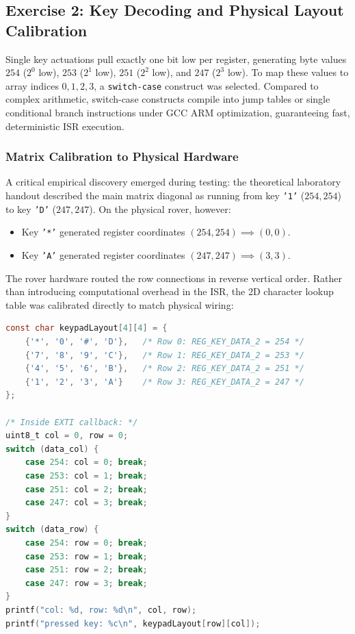 \subsection{Exercise 2: Key Decoding and Physical Layout Calibration}
Single key actuations pull exactly one bit low per register, generating byte values $254$ ($2^0$ low), $253$ ($2^1$ low), $251$ ($2^2$ low), and $247$ ($2^3$ low). To map these values to array indices $0, 1, 2, 3$, a \texttt{switch-case} construct was selected. Compared to complex arithmetic, switch-case constructs compile into jump tables or single conditional branch instructions under GCC ARM optimization, guaranteeing fast, deterministic ISR execution.

\subsubsection{Matrix Calibration to Physical Hardware}
A critical empirical discovery emerged during testing: the theoretical laboratory handout described the main matrix diagonal as running from key \texttt{'1'} ($254, 254$) to key \texttt{'D'} ($247, 247$). On the physical rover, however:
\begin{itemize}[noitemsep,topsep=2pt]
    \item Key \texttt{'*'} generated register coordinates $(254, 254) \implies (0, 0)$.
    \item Key \texttt{'A'} generated register coordinates $(247, 247) \implies (3, 3)$.
\end{itemize}
The rover hardware routed the row connections in reverse vertical order. Rather than introducing computational overhead in the ISR, the 2D character lookup table was calibrated directly to match physical wiring:

\begin{lstlisting}[language=C, caption={Coordinate decoding and calibrated 2D matrix layout.}, label={lst:ex2_decode}]
const char keypadLayout[4][4] = {
    {'*', '0', '#', 'D'},   /* Row 0: REG_KEY_DATA_2 = 254 */
    {'7', '8', '9', 'C'},   /* Row 1: REG_KEY_DATA_2 = 253 */
    {'4', '5', '6', 'B'},   /* Row 2: REG_KEY_DATA_2 = 251 */
    {'1', '2', '3', 'A'}    /* Row 3: REG_KEY_DATA_2 = 247 */
};

/* Inside EXTI callback: */
uint8_t col = 0, row = 0;
switch (data_col) {
    case 254: col = 0; break;
    case 253: col = 1; break;
    case 251: col = 2; break;
    case 247: col = 3; break;
}
switch (data_row) {
    case 254: row = 0; break;
    case 253: row = 1; break;
    case 251: row = 2; break;
    case 247: row = 3; break;
}
printf("col: %d, row: %d\n", col, row);
printf("pressed key: %c\n", keypadLayout[row][col]);
\end{lstlisting}


